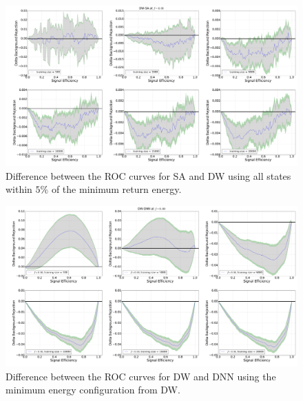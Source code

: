 \begin{figure}[h]
\begin{adjustbox}{center}
\includegraphics[width=\paperwidth]{DW--SA_L5}
\end{adjustbox}
\caption{Difference between the ROC curves for SA and DW using all states within $5\%$ of the minimum return energy.}
\label{fig:SA_DW_L5_droc}
\end{figure}
\begin{figure}[h]
\begin{adjustbox}{center}
\includegraphics[width=\paperwidth]{DW--DNN_GS}
\end{adjustbox}
\caption{Difference between the ROC curves for DW and DNN using the minimum energy configuration from DW.}
\label{fig:SA_DNN_GS_droc}
\end{figure} 

